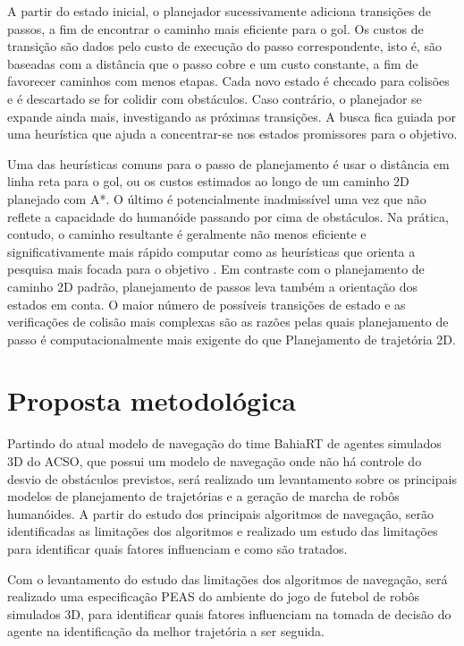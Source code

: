 \documentclass[font=plain]{abnt}
\begin{document}
A partir do estado inicial, o planejador sucessivamente adiciona transições de passos, a fim de encontrar o caminho mais eficiente para o gol. 
Os custos de transição são dados pelo custo de execução do passo correspondente, isto é, são baseadas com a distância que o passo cobre e um 
custo constante, a fim de favorecer caminhos com menos etapas. Cada novo estado é checado para colisões e é descartado se for colidir com 
obstáculos. Caso contrário, o planejador se expande ainda mais, investigando as próximas transições. A busca fica guiada por uma heurística
que ajuda a concentrar-se nos estados promissores para o objetivo.

Uma das heurísticas comuns para o passo de planejamento é usar o distância em linha reta para o gol, ou os custos estimados ao longo de um caminho 2D 
planejado com A*. O último é potencialmente inadmissível uma vez que não reflete a capacidade do humanóide passando por cima de obstáculos.
Na prática, contudo, o caminho resultante é geralmente não menos eficiente e significativamente mais rápido computar como as heurísticas
que orienta a pesquisa mais focada para o objetivo \cite{pgarimort}. Em contraste com o planejamento de caminho 2D padrão,
planejamento de passos leva também a orientação dos estados em conta. O maior número de possíveis transições de estado e as verificações de 
colisão mais complexas são as razões pelas quais planejamento de passo é computacionalmente mais exigente do que Planejamento de trajetória 2D.

\chapter{Proposta metodol\'ogica}

Partindo do atual modelo de navegação do time BahiaRT de agentes simulados 3D do ACSO, que possui um modelo de navegação onde não há controle do desvio
de obstáculos previstos, será realizado um levantamento sobre os principais modelos de planejamento de trajetórias e a geração de marcha de robôs humanóides.
A partir do estudo dos principais algoritmos de navegação, serão identificadas as limitações dos algoritmos e realizado um estudo das limitações para 
identificar quais fatores influenciam e como são tratados.

Com o levantamento do estudo das limitações dos algoritmos de navegação, será realizado uma especificação PEAS \cite{brussel} do ambiente do jogo de futebol
de robôs simulados 3D, para identificar quais fatores influenciam na tomada de decisão do agente na identificação da melhor trajetória a ser seguida.
\end{document}

